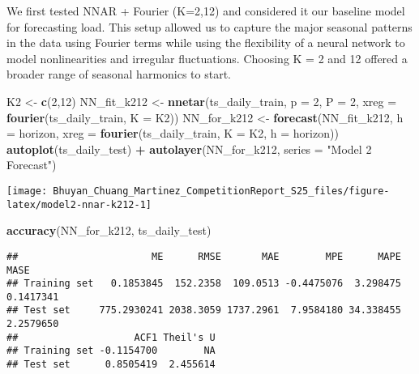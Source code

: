 \documentclass[
]{article}
\newenvironment{Shaded}{\begin{snugshade}}{\end{snugshade}}
\newcommand{\AttributeTok}[1]{\textcolor[rgb]{0.13,0.29,0.53}{#1}}
\newcommand{\DecValTok}[1]{\textcolor[rgb]{0.00,0.00,0.81}{#1}}
\newcommand{\FunctionTok}[1]{\textcolor[rgb]{0.13,0.29,0.53}{\textbf{#1}}}
\newcommand{\NormalTok}[1]{#1}
\newcommand{\OtherTok}[1]{\textcolor[rgb]{0.56,0.35,0.01}{#1}}
\newcommand{\SpecialCharTok}[1]{\textcolor[rgb]{0.81,0.36,0.00}{\textbf{#1}}}
\newcommand{\StringTok}[1]{\textcolor[rgb]{0.31,0.60,0.02}{#1}}
\begin{document}
We first tested NNAR + Fourier (K=2,12) and considered it our baseline
model for forecasting load. This setup allowed us to capture the major
seasonal patterns in the data using Fourier terms while using the
flexibility of a neural network to model nonlinearities and irregular
fluctuations. Choosing K = 2 and 12 offered a broader range of seasonal
harmonics to start.

\begin{Shaded}
\begin{Highlighting}[]
\NormalTok{K2 }\OtherTok{\textless{}{-}} \FunctionTok{c}\NormalTok{(}\DecValTok{2}\NormalTok{,}\DecValTok{12}\NormalTok{)}
\NormalTok{NN\_fit\_k212 }\OtherTok{\textless{}{-}} \FunctionTok{nnetar}\NormalTok{(ts\_daily\_train, }\AttributeTok{p =} \DecValTok{2}\NormalTok{, }\AttributeTok{P =} \DecValTok{2}\NormalTok{, }\AttributeTok{xreg =} \FunctionTok{fourier}\NormalTok{(ts\_daily\_train, }\AttributeTok{K =}\NormalTok{ K2))}
\NormalTok{NN\_for\_k212 }\OtherTok{\textless{}{-}} \FunctionTok{forecast}\NormalTok{(NN\_fit\_k212, }\AttributeTok{h =}\NormalTok{ horizon, }\AttributeTok{xreg =} \FunctionTok{fourier}\NormalTok{(ts\_daily\_train, }\AttributeTok{K =}\NormalTok{ K2, }\AttributeTok{h =}\NormalTok{ horizon))}
\FunctionTok{autoplot}\NormalTok{(ts\_daily\_test) }\SpecialCharTok{+} \FunctionTok{autolayer}\NormalTok{(NN\_for\_k212, }\AttributeTok{series =} \StringTok{"Model 2 Forecast"}\NormalTok{)}
\end{Highlighting}
\end{Shaded}

\begin{center}\texttt{[image: Bhuyan\_Chuang\_Martinez\_CompetitionReport\_S25\_files/figure-latex/model2-nnar-k212-1]} \end{center}

\begin{Shaded}
\begin{Highlighting}[]
\FunctionTok{accuracy}\NormalTok{(NN\_for\_k212, ts\_daily\_test)}
\end{Highlighting}
\end{Shaded}

\begin{verbatim}
##                       ME      RMSE       MAE        MPE      MAPE      MASE
## Training set   0.1853845  152.2358  109.0513 -0.4475076  3.298475 0.1417341
## Test set     775.2930241 2038.3059 1737.2961  7.9584180 34.338455 2.2579650
##                    ACF1 Theil's U
## Training set -0.1154700        NA
## Test set      0.8505419  2.455614
\end{verbatim}
\end{document}
